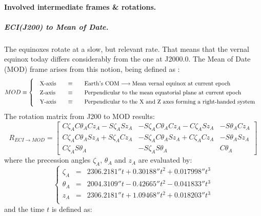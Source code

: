 		\paragraph{Involved intermediate frames \& rotations. \\}
		\subparagraph{ECI(J200) to Mean of Date. \\}
		\indent The equinoxes rotate at a slow, but relevant rate. That means that the vernal equinox today differs considerably from the one at J2000.0. The Mean of Date (MOD) frame arises from this notion, being defined as \cite{Tapley}: \\
		\[
		\arraycolsep=10pt
		\def\arraystretch{1.3}
		MOD\equiv\left\{
		\begin{array}{lll}
		\text{X-axis} 	& \equiv 	& \text{Earth's COM} \longrightarrow \text{Mean vernal equinox at current epoch} \\
		\text{Z-axis} 	& \equiv 	& \text{Perpendicular to the mean equatorial plane at current epoch} \\
		\text{Y-axis} 	& \equiv 	& \text{Perpendicular to the X and Z axes forming a right-handed system} \\
		\end{array}
		\right.
		\]
		\indent The rotation matrix from J200 to MOD results:
		\begin{equation}
		R_{ECI\rightarrow MOD} = 
		\left[ 
		\begin{array}{lll}
		C \zeta_A C \theta_A C z_A - S \zeta_A S z_A 	& - S \zeta_A C \theta_A C z_A - C \zeta_A S z_A 	& -S \theta_A C z_A \\
		C \zeta_A C \theta_A S z_A + S \zeta_A C z_A 	& - S \zeta_A C \theta_A S z_A + C \zeta_A C z_A 	& -S \theta_A S z_A \\
 		C \zeta_A S \theta_A 							& - S \zeta_A S \theta_A 							& C \theta_A
		\end{array}
		\right]
		\label{eq: R_ECI_MOD}
		\end{equation}
		\noindent where the precession angles $\zeta_A$, $\theta_A$ and $z_A$ are evaluated by:
		\[
		\left\{ 
		\begin{array}{lll}
		\zeta_A 	& = & 2306.2181'' t + 0.30188'' t^2 + 0.017998'' t^3 \\
		\theta_A 	& =	& 2004.3109'' t - 0.42665'' t^2 - 0.041833'' t^3 \\
		z_A 		& =	& 2306.2181'' t + 1.09468'' t^2 + 0.018203'' t^3 \\ 
		\end{array}
		\right.
		\]
		\noindent and the time $t$ is defined as:
